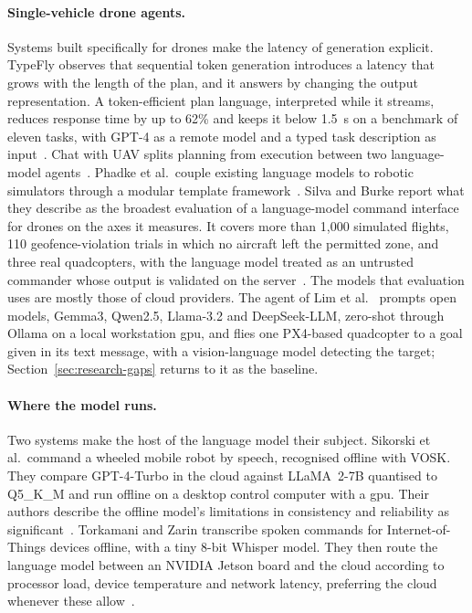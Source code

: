 \paragraph{Single-vehicle drone agents.} Systems built specifically for drones make the latency of
generation explicit. TypeFly observes that sequential token generation introduces a latency that
grows with the length of the plan, and it answers by changing the output representation. A
token-efficient plan language, interpreted while it streams, reduces response time by up to 62\% and
keeps it below 1.5~s on a benchmark of eleven tasks, with GPT-4 as a remote model and a typed task
description as input~\cite{typefly2024}. Chat with UAV splits planning from execution between two
language-model agents~\cite{chatwithuav2025}. Phadke et al.\ couple existing language models to
robotic simulators through a modular template framework~\cite{phadke2024}. Silva and Burke report
what they describe as the broadest evaluation of a language-model command interface for drones on
the axes it measures. It covers more than 1{,}000 simulated flights, 110 geofence-violation trials
in which no aircraft left the permitted zone, and three real quadcopters, with the language model
treated as an untrusted commander whose output is validated on the server~\cite{silva2026}. The
models that evaluation uses are mostly those of cloud providers. The agent of Lim et
al.~\cite{lim2025} prompts open models, Gemma3, Qwen2.5, Llama-3.2 and DeepSeek-LLM, zero-shot
through Ollama on a local workstation \gls{gpu}, and flies one PX4-based quadcopter to a goal given
in its text message, with a vision-language model detecting the target;
Section~\ref{sec:research-gaps} returns to it as the baseline.

\paragraph{Where the model runs.} Two systems make the host of the language model their subject.
Sikorski et al.\ command a wheeled mobile robot by speech, recognised offline with VOSK. They
compare GPT-4-Turbo in the cloud against LLaMA~2-7B quantised to Q5\_K\_M and run offline on a
desktop control computer with a \gls{gpu}. Their authors describe the offline model's limitations in
consistency and reliability as significant~\cite{sikorski2025}. Torkamani and Zarin transcribe
spoken commands for Internet-of-Things devices offline, with a tiny 8-bit Whisper model. They then
route the language model between an NVIDIA Jetson board and the cloud according to processor load,
device temperature and network latency, preferring the cloud whenever these
allow~\cite{torkamani2025}.

